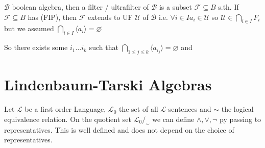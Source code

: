 {\begin{enumerate}[label=(\roman*)]
\begin{multicols}{2}
            $\mathcal{B}$ boolean algebra, then a filter / ultrafilter of $\mathcal{B}$ is a subset $\mathcal{F}\subseteq B$ s.th.
            If $\mathcal{F}\subseteq B$ has (FIP), then $\mathcal{F}$ extends to UF $\mathcal{U}$ of $\mathcal{B}$
            i.e. $\forall i\in I a_i\in \mathcal{U}$ so $\mathcal{U}\in \bigcap_{i\in I}F_i $ but we assumed $\bigcap_{i\in I}\langle a_i\rangle = \varnothing$
        \end{multicols}
        So there exists some $i_1\dots i_k$ such that $\bigcap_{1\leq j\leq k}\langle a_{i_j}\rangle =\varnothing$ and 
    \end{enumerate}
}


\section{Lindenbaum-Tarski Algebras}
Let $\mathcal{L}$ be a first order Language, $\mathcal{L}_0$ the set of all $\mathcal{L}$-sentences and $\sim$ the logical equivalence relation.
On the quotient set $\mathcal{L}_0/_\sim$ we can define $\land,\lor,\lnot$ py passing to representatives. This is well defined and does not depend on the choice of representatives.

